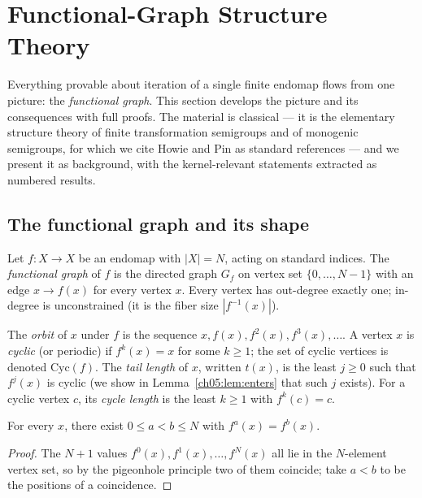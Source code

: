 \section{Functional-Graph Structure Theory}
\label{ch05:sec:structure}

Everything provable about iteration of a single finite endomap flows from
one picture: the \emph{functional graph}. This section develops the picture
and its consequences with full proofs. The material is classical --- it is
the elementary structure theory of finite transformation semigroups and of
monogenic semigroups, for which we cite Howie \cite{howie} and Pin
\cite{pin} as standard references --- and we present it as background, with
the kernel-relevant statements extracted as numbered results.

\subsection{The functional graph and its shape}

\begin{definition}
\label{ch05:def:funcgraph}
Let $f : X \to X$ be an endomap with $|X| = N$, acting on standard indices.
The \emph{functional graph} of $f$ is the directed graph $G_f$ on vertex
set $\{0, \dots, N-1\}$ with an edge $x \to f(x)$ for every vertex $x$.
Every vertex has out-degree exactly one; in-degree is unconstrained (it is
the fiber size $|f^{-1}(x)|$).
\end{definition}

\begin{definition}
\label{ch05:def:orbit}
The \emph{orbit} of $x$ under $f$ is the sequence
$x, f(x), f^{2}(x), f^{3}(x), \dots$. A vertex $x$ is \emph{cyclic} (or
periodic) if $f^{k}(x) = x$ for some $k \ge 1$; the set of cyclic vertices
is denoted $\mathrm{Cyc}(f)$. The \emph{tail length} of $x$, written
$t(x)$, is the least $j \ge 0$ such that $f^{j}(x)$ is cyclic (we show in
Lemma~\ref{ch05:lem:enters} that such $j$ exists). For a cyclic vertex $c$,
its \emph{cycle length} is the least $k \ge 1$ with $f^{k}(c) = c$.
\end{definition}

\begin{lemma}
\label{ch05:lem:repeat}
For every $x$, there exist $0 \le a < b \le N$ with $f^{a}(x) = f^{b}(x)$.
\end{lemma}

\begin{proof}
The $N+1$ values $f^{0}(x), f^{1}(x), \dots, f^{N}(x)$ all lie in the
$N$-element vertex set, so by the pigeonhole principle two of them coincide;
take $a < b$ to be the positions of a coincidence.
\end{proof}

